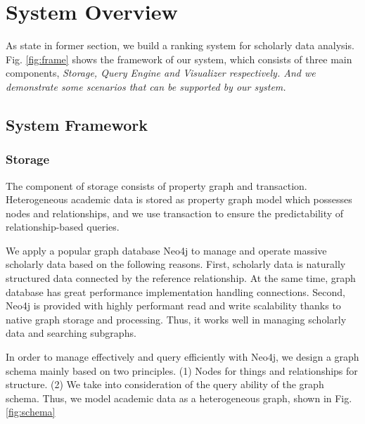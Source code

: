 \section{System Overview}
\label{sec-system}

As state in former section, we build a ranking system for scholarly data analysis. Fig. \ref{fig:frame} shows the framework of our system, which consists of three main components, \itshape Storage, Query Engine \upshape and \itshape Visualizer \upshape respectively. And we demonstrate some scenarios that can be supported by our system.

\subsection{System Framework}

\subsubsection{Storage}
\par
The component of storage consists of property graph and transaction. Heterogeneous academic data is stored as property graph model which possesses nodes and relationships, and we use transaction to ensure the predictability of relationship-based queries.

\par
We apply a popular graph database Neo4j \cite{Neo4j} to manage and operate massive scholarly data based on the following reasons. First, scholarly data is naturally structured data connected by the reference relationship. At the same time, graph database has great performance implementation handling connections. Second, Neo4j is provided with highly performant read and write scalability thanks to native graph storage and processing. Thus, it works well in managing scholarly data and searching subgraphs.

\par
In order to manage effectively and query efficiently with Neo4j, we design a graph schema mainly based on two principles. (1) Nodes for things and relationships for structure. (2) We take into consideration of the query ability of the graph schema. Thus, we model academic data as a heterogeneous graph, shown in Fig. \ref{fig:schema}

